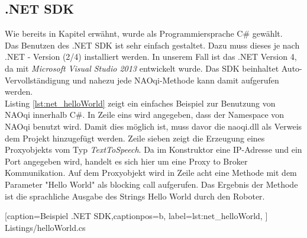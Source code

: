 \subsection{.NET SDK}
Wie bereits in Kapitel  erwähnt, wurde als Programmiersprache C\# gewählt. 
\\
Das Benutzen des .NET SDK ist sehr einfach gestaltet. Dazu muss dieses je nach .NET - Version (2/4) installiert werden. In unserem Fall ist das .NET Version 4, da mit \textit{Microsoft Visual Studio 2013} entwickelt wurde. Das SDK beinhaltet Auto-Vervollständigung und nahezu jede NAOqi-Methode kann damit aufgerufen werden.
\\
 Listing \ref{lst:net_helloWorld} zeigt ein einfaches Beispiel zur Benutzung von NAOqi innerhalb C\#. In Zeile eins wird angegeben, dass der Namespace von NAOqi benutzt wird. Damit dies möglich ist, muss davor die \textsf{naoqi.dll} als Verweis dem Projekt hinzugefügt werden. Zeile sieben zeigt die Erzeugung eines Proxyobjekts vom Typ \textit{TextToSpeech}. Da im Konstruktor eine IP-Adresse und ein Port angegeben wird, handelt es sich hier um eine Proxy to Broker Kommunikation. Auf dem Proxyobjekt wird in Zeile acht eine Methode mit dem Parameter \textsf{"Hello World"} als blocking call aufgerufen. Das Ergebnis der Methode ist die sprachliche Ausgabe des Strings \textsf{Hello World} durch den Roboter.


    [caption={Beispiel .NET SDK},captionpos=b,
       label=lst:net_helloWorld,
       ]	
 {Listings/helloWorld.cs}

